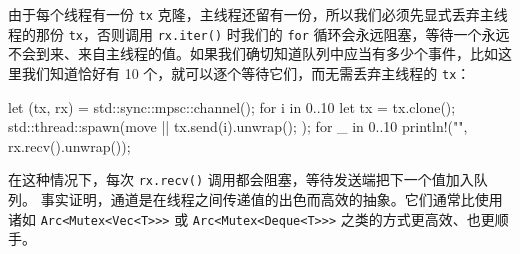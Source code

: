 由于每个线程有一份 \texttt{tx} 克隆，主线程还留有一份，所以我们必须先显式丢弃主线程的那份 \texttt{tx}，否则调用 \texttt{rx.iter()} 时我们的 \texttt{for} 循环会永远阻塞，等待一个永远不会到来、来自主线程的值。如果我们确切知道队列中应当有多少个事件，比如这里我们知道恰好有 10 个，就可以逐个等待它们，而无需丢弃主线程的 \texttt{tx}：
\begin{codebox}[rust]
let (tx, rx) = std::sync::mpsc::channel();
for i in 0..10 {
      let tx = tx.clone();
      std::thread::spawn(move || {
            tx.send(i).unwrap();
      });
}
for _ in 0..10 {
      println!("{}", rx.recv().unwrap());
}
\end{codebox}
在这种情况下，每次 \texttt{rx.recv()} 调用都会阻塞，等待发送端把下一个值加入队列。
事实证明，通道是在线程之间传递值的出色而高效的抽象。它们通常比使用诸如 \texttt{Arc<\allowbreak{}Mutex<\allowbreak{}Vec<\allowbreak{}T>\allowbreak{}>\allowbreak{}>\allowbreak{}} 或
\texttt{Arc<\allowbreak{}Mutex<\allowbreak{}Deque<\allowbreak{}T>\allowbreak{}>\allowbreak{}>\allowbreak{}} 之类的方式更高效、也更顺手。
